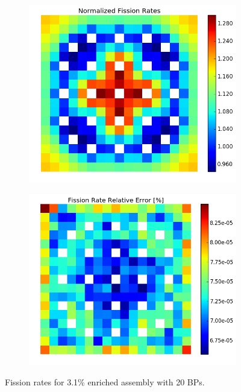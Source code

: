 \begin{figure}[h!]
\centering
\begin{subfigure}{0.5\textwidth}
  \centering
  \includegraphics[width=\linewidth]{figures/benchmarks/fission-rates/fiss-mean-fuel-31-20BAs}
  \caption{}
  \label{fig:chap7-fiss-rate-mean-3.1-20BAs-assm}
\end{subfigure}%
\begin{subfigure}{0.5\textwidth}
  \centering
  \includegraphics[width=\linewidth]{figures/benchmarks/fission-rates/fiss-rel-err-fuel-31-20BAs}
  \caption{}
  \label{fig:chap7-fiss-rate-rel-err-3.1-20BAs-assm}
\end{subfigure}%
\caption[Fission rates for 3.1\% enriched assembly with 20 BPs]{Fission rates for 3.1\% enriched assembly with 20 \ac{BP}s.}
\label{fig:chap7-fiss-rates-3.1-assm-20BAs}
\end{figure}

